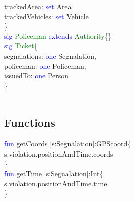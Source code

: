 trackedArea: \textcolor{blue}{set} Area\\
trackedVehicles: \textcolor{blue}{set} Vehicle\\
\} \\
\textcolor{blue}{sig}
\textcolor{green}{Policeman}
\textcolor{blue}{extends}
\textcolor{green}{Authority}\{\}\\
\textcolor{blue}{sig}
\textcolor{green}{Ticket}\{ \\
segnalations: \textcolor{blue}{one} Segnalation,\\
policeman: \textcolor{blue}{one} Policeman,\\
issuedTo: \textcolor{blue}{one} Person\\
\}\\
\\
\subsection{Functions}
\textcolor{blue}{fun}
\textcolor{mycolor}{getCoords} [s:Segnalation]:GPScoord\{\\
s.violation.positionAndTime.coords\\
\}\\
\textcolor{blue}{fun}
\textcolor{mycolor}{getTime} [s:Segnalation]:Int\{\\
s.violation.positionAndTime.time\\
\}\\
\\
